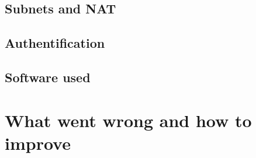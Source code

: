 \documentclass[a4paper,12pt]{article}
\begin{document}
\subsection{Subnets and NAT}

\subsection{Authentification}

\subsection{Software used}


\section{What went wrong and how to improve}
\end{document}
